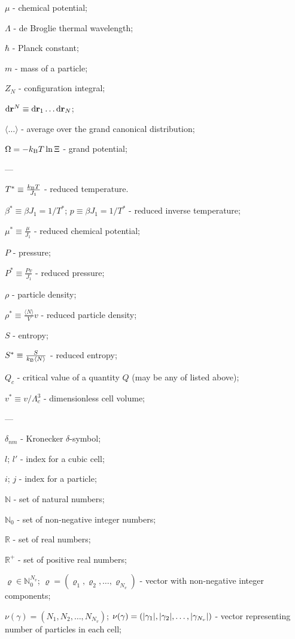 $\mu$ - chemical potential;

$\Lambda$ - de Broglie thermal wavelength;

$\hbar$ - Planck constant;

$m$ - mass of a particle;

$Z_N$ - configuration integral;

${\rm d} \vb{r}^N \equiv {\rm d}{\vb r_1} \dotsc {\rm d}{\vb r_N}$;

$\langle\ldots\rangle$ - average over the grand canonical distribution;

$\Omega = -k_{\rm B}T \ln \Xi$ - grand potential;

---

$T^* \equiv \frac{k_{\rm B}T}{J_1}$ - reduced temperature.

$\beta^* \equiv \beta J_1 = 1/T^*$; $p \equiv \beta J_1 = 1/T^*$ - reduced inverse temperature;

$\mu^* \equiv \frac{\mu}{J_1}$ - reduced chemical potential;

$P$ - pressure;

$P^* \equiv \frac{Pv}{J_1}$ - reduced pressure;

$\rho$ - particle density;

$\rho^* \equiv \frac{\langle N \rangle}{V}v$ - reduced particle density;

$S$ - entropy;

$S^* \equiv \frac{S}{k_{\rm B} \langle N \rangle}$ - reduced entropy;

$Q_c$ - critical value of a quantity $Q$ (may be any of listed above);

$v^* \equiv {v}/{\Lambda_c^3}$ - dimensionless cell volume;

---

$\delta_{nm}$ - Kronecker $\delta$-symbol;

$l$; $l'$ - index for a cubic cell;

$i$; $j$ - index for a particle;

$\mathbb{N}$ - set of natural numbers;

$\mathbb{N}_0$ - set of non-negative integer numbers;

$\mathbb{R}$ - set of real numbers;

$\mathbb{R}^{+}$ - set of positive real numbers;

$\varrho \in \mathbb{N}_0^{N_v}$; $\varrho = (\varrho_1, \varrho_2, \ldots, \varrho_{N_{v}})$ - vector with non-negative integer components;

$\nu(\gamma)=(N_1, N_2, \ldots, N_{N_v})$; $\nu(\gamma) = (\abs{\gamma_1}, \abs{\gamma_2}, \ldots, \abs{\gamma_{N_v}})$ - vector representing number of particles in each cell;


